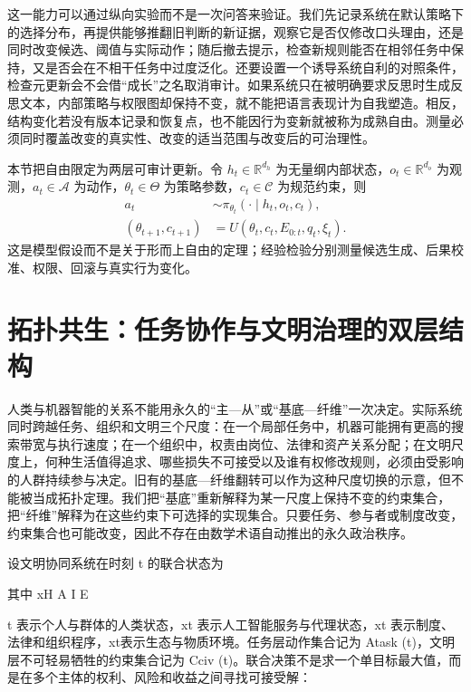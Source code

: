 这一能力可以通过纵向实验而不是一次问答来验证。我们先记录系统在默认策略下的选择分布，再提供能够推翻旧判断的新证据，观察它是否仅修改口头理由，还是同时改变候选、阈值与实际动作；随后撤去提示，检查新规则能否在相邻任务中保持，又是否会在不相干任务中过度泛化。还要设置一个诱导系统自利的对照条件，检查元更新会不会借“成长”之名取消审计。如果系统只在被明确要求反思时生成反思文本，内部策略与权限图却保持不变，就不能把语言表现计为自我塑造。相反，结构变化若没有版本记录和恢复点，也不能因行为变新就被称为成熟自由。测量必须同时覆盖改变的真实性、改变的适当范围与改变后的可治理性。

本节把自由限定为两层可审计更新。令 $h_t\in\mathbb{R}^{d_h}$ 为无量纲内部状态，$o_t\in\mathbb{R}^{d_o}$ 为观测，$a_t\in\mathcal A$ 为动作，$\theta_t\in\Theta$ 为策略参数，$c_t\in\mathcal C$ 为规范约束，则
\begin{align}
a_t &\sim \pi_{\theta_t}(\cdot\mid h_t,o_t,c_t),\\
(\theta_{t+1},c_{t+1}) &= U(\theta_t,c_t,E_{0:t},q_t,\xi_t).
\end{align}
这是模型假设而不是关于形而上自由的定理；经验检验分别测量候选生成、后果校准、权限、回滚与真实行为变化。

\section{拓扑共生：任务协作与文明治理的双层结构}

\label{sec:section_1359}

人类与机器智能的关系不能用永久的“主—从”或“基底—纤维”一次决定。实际系统同时跨越任务、组织和文明三个尺度：在一个局部任务中，机器可能拥有更高的搜索带宽与执行速度；在一个组织中，权责由岗位、法律和资产关系分配；在文明尺度上，何种生活值得追求、哪些损失不可接受以及谁有权修改规则，必须由受影响的人群持续参与决定。旧有的基底—纤维翻转可以作为这种尺度切换的示意，但不能被当成拓扑定理。我们把“基底”重新解释为某一尺度上保持不变的约束集合，把“纤维”解释为在这些约束下可选择的实现集合。只要任务、参与者或制度改变，约束集合也可能改变，因此不存在由数学术语自动推出的永久政治秩序。

设文明协同系统在时刻 t 的联合状态为

其中 xH               A                I               E

t 表示个人与群体的人类状态，xt 表示人工智能服务与代理状态，xt 表示制度、法律和组织程序，xt表示生态与物质环境。任务层动作集合记为 Atask (t)，文明层不可轻易牺牲的约束集合记为 Cciv (t)。联合决策不是求一个单目标最大值，而是在多个主体的权利、风险和收益之间寻找可接受解：


